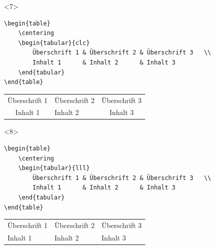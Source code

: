 \documentclass["WS\space 16-17\space -\space LaTeX-Kurs\space -\space Praesentation\space -\space 2.tex"]{subfiles}
\begin{document}
\begin{frame}[fragile]
	\begin{onlyenv}
		\Code
		\begin{lstlisting}
\begin{table}
	\centering
	\begin{tabular}{clc}
		Überschrift 1 & Überschrift 2 & Überschrift 3	\\
		Inhalt 1      & Inhalt 2      & Inhalt 3
	\end{tabular}
\end{table}
		\end{lstlisting}
		\Ausgabe
		\begin{outputbox}
			\begin{table}
				\centering
				\begin{tabular}{clc}
					Überschrift 1 & Überschrift 2 & Überschrift 3	\\
					Inhalt 1 & Inhalt 2 & Inhalt 3
				\end{tabular}
			\end{table}
		\end{outputbox}
	\end{onlyenv}

	\begin{onlyenv}
		\Code
		\begin{lstlisting}
\begin{table}
	\centering
	\begin{tabular}{lll}
		Überschrift 1 & Überschrift 2 & Überschrift 3	\\
		Inhalt 1      & Inhalt 2      & Inhalt 3
	\end{tabular}
\end{table}
		\end{lstlisting}
		\Ausgabe
		\begin{outputbox}
			\begin{table}
				\centering
				\begin{tabular}{lll}
					Überschrift 1 & Überschrift 2 & Überschrift 3	\\
					Inhalt 1 & Inhalt 2 & Inhalt 3
				\end{tabular}
			\end{table}
		\end{outputbox}
	\end{onlyenv}


\end{frame}
\end{document}
